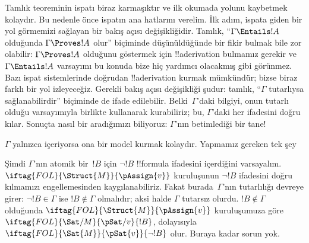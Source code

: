

      {}
      {}


Tamlık teoreminin ispatı biraz karmaşıktır ve ilk okumada yolunu
kaybetmek kolaydır. Bu nedenle önce ispatın ana hatlarını verelim. İlk
adım, ispata giden bir yol görmemizi sağlayan bir bakış açısı
değişikliğidir. Tamlık, ``$\Gamma \Entails !A$ olduğunda $\Gamma
\Proves !A$ olur'' biçiminde düşünüldüğünde bir fikir bulmak bile zor
olabilir: $\Gamma \Proves !A$ olduğunu göstermek için !!a{derivation}
bulmamız gerekir ve $\Gamma \Entails !A$ varsayımı bu konuda bize
hiç yardımcı olacakmış gibi görünmez. Bazı ispat sistemlerinde doğrudan
!!a{derivation} kurmak mümkündür; bizse biraz farklı bir yol izleyeceğiz.
Gerekli bakış açısı değişikliği şudur: tamlık, ``$\Gamma$ tutarlıysa
sağlanabilirdir'' biçiminde de ifade edilebilir. Belki~$\Gamma$'daki
bilgiyi, onun tutarlı olduğu varsayımıyla birlikte kullanarak
 kurabiliriz; bu,
$\Gamma$'daki her  ifadesini doğru
kılar. Sonuçta nasıl bir
 aradığımızı biliyoruz:
$\Gamma$'nın betimlediği bir tane!

$\Gamma$ yalnızca 
içeriyorsa ona bir model kurmak kolaydır. Yapmamız gereken tek şey

Şimdi $\Gamma$'nın atomik bir~$!B$ için $\lnot !B$ !!{formula}
ifadesini içerdiğini varsayalım. $\iftag{FOL}{\Struct{M}}{\pAssign{v}}$
kuruluşunun $\lnot !B$ ifadesini doğru kılmamızı engellemesinden
kaygılanabiliriz. Fakat burada~$\Gamma$'nın tutarlılığı devreye girer:
$\lnot !B\in\Gamma$ ise $!B\notin\Gamma$ olmalıdır; aksi halde
$\Gamma$ tutarsız olurdu. $!B\notin\Gamma$ olduğunda
$\iftag{FOL}{\Struct{M}}{\pAssign{v}}$ kuruluşumuza göre
$\iftag{FOL}{\Sat/{M}}{\pSat/{v}}{!B}$, dolayısıyla
$\iftag{FOL}{\Sat{M}}{\pSat{v}}{\lnot !B}$ olur. Buraya kadar sorun yok.

